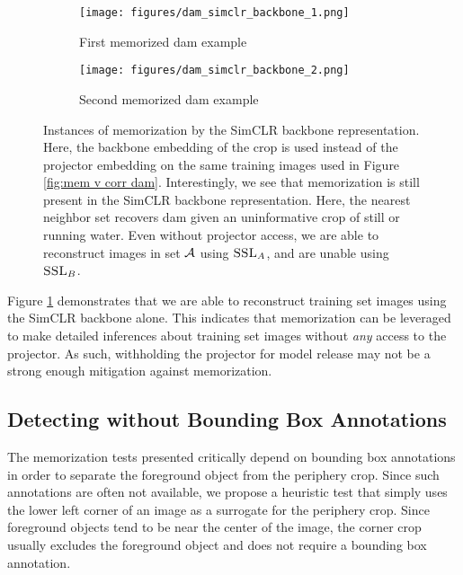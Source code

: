 \begin{figure}[h]
     \centering
     \begin{subfigure}[b]{\textwidth}
         \centering
         \texttt{[image: figures/dam\_simclr\_backbone\_1.png]}
         \caption{First {\color{part_orange}memorized} dam example}
     \end{subfigure}
     \begin{subfigure}[b]{\textwidth}
         \centering
         \texttt{[image: figures/dam\_simclr\_backbone\_2.png]}
         \caption{Second {\color{part_orange}memorized} dam example}
     \end{subfigure}
     \hfill
     \caption{Instances of \dejavu memorization by the SimCLR backbone representation. Here, the backbone embedding of the crop is used instead of the projector embedding on the same training images used in Figure \ref{fig:mem v corr dam}. Interestingly, we see that \dejavu memorization is still present in the SimCLR backbone representation. Here, the nearest neighbor set recovers dam given an uninformative crop of still or running water. Even without projector access, we are able to reconstruct images in set $\mathcal{A}$ using $\textsc{SSL}_A$, and are unable using $\textsc{SSL}_B$. }
     \label{fig:simclr backbone dejavu}
\end{figure}


Figure \ref{fig:simclr backbone dejavu} demonstrates that we are able to reconstruct training set images using the SimCLR backbone alone. This indicates that \dejavu memorization can be leveraged to make detailed inferences about training set images without \emph{any} access to the projector. As such, withholding the projector for model release may not be a strong enough mitigation against \dejavu memorization.  

\clearpage

\subsection{Detecting \Dejavu without Bounding Box Annotations}
\label{sec:appx corner crop} 
The memorization tests presented critically depend on bounding box annotations in order to separate the foreground object from the periphery crop. Since such annotations are often not available, we propose a heuristic test that simply uses the lower left corner of an image as a surrogate for the periphery crop. Since foreground objects tend to be near the center of the image, the corner crop usually excludes the foreground object and does not require a bounding box annotation. 

